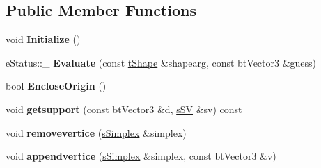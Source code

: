 \subsection*{Public Member Functions}
\begin{DoxyCompactItemize}
\item 
\hypertarget{structgjkepa2__impl_1_1_g_j_k_a1cd1cd7827d81afe62d27022fc3a5a38}{void {\bfseries Initialize} ()}\label{structgjkepa2__impl_1_1_g_j_k_a1cd1cd7827d81afe62d27022fc3a5a38}

\item 
\hypertarget{structgjkepa2__impl_1_1_g_j_k_aef02ebcb7c4628eea04d9fd6a6a2867a}{e\+Status\+::\+\_\+ {\bfseries Evaluate} (const \hyperlink{structgjkepa2__impl_1_1_minkowski_diff}{t\+Shape} \&shapearg, const bt\+Vector3 \&guess)}\label{structgjkepa2__impl_1_1_g_j_k_aef02ebcb7c4628eea04d9fd6a6a2867a}

\item 
\hypertarget{structgjkepa2__impl_1_1_g_j_k_a1cb2261d5ad6b120b6741dbb32bc0961}{bool {\bfseries Enclose\+Origin} ()}\label{structgjkepa2__impl_1_1_g_j_k_a1cb2261d5ad6b120b6741dbb32bc0961}

\item 
\hypertarget{structgjkepa2__impl_1_1_g_j_k_a5e507366c9533778bc27fa014d750d58}{void {\bfseries getsupport} (const bt\+Vector3 \&d, \hyperlink{structgjkepa2__impl_1_1_g_j_k_1_1s_s_v}{s\+S\+V} \&sv) const }\label{structgjkepa2__impl_1_1_g_j_k_a5e507366c9533778bc27fa014d750d58}

\item 
\hypertarget{structgjkepa2__impl_1_1_g_j_k_a60f7bd45348913e0fd18b3227f727897}{void {\bfseries removevertice} (\hyperlink{structgjkepa2__impl_1_1_g_j_k_1_1s_simplex}{s\+Simplex} \&simplex)}\label{structgjkepa2__impl_1_1_g_j_k_a60f7bd45348913e0fd18b3227f727897}

\item 
\hypertarget{structgjkepa2__impl_1_1_g_j_k_aae2a3d9ae71bf888ee700a0f18b9125b}{void {\bfseries appendvertice} (\hyperlink{structgjkepa2__impl_1_1_g_j_k_1_1s_simplex}{s\+Simplex} \&simplex, const bt\+Vector3 \&v)}\label{structgjkepa2__impl_1_1_g_j_k_aae2a3d9ae71bf888ee700a0f18b9125b}

\end{DoxyCompactItemize}
